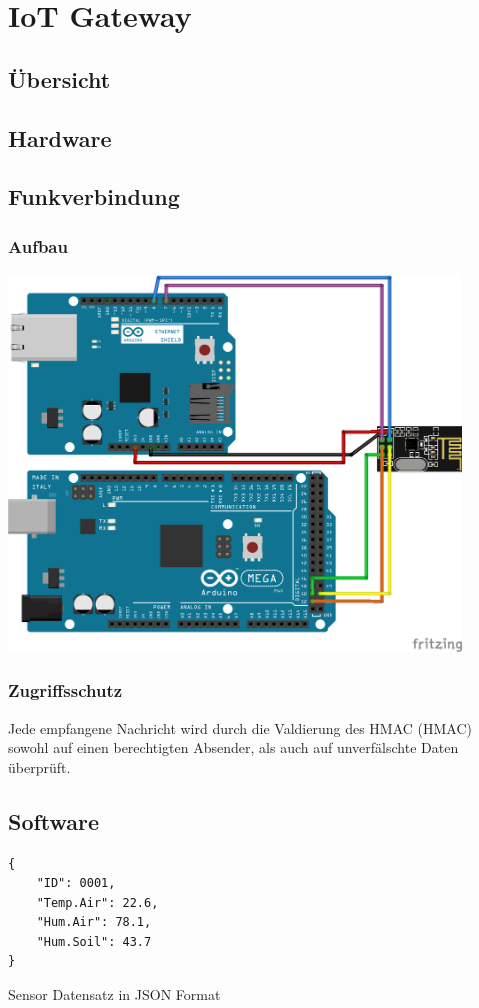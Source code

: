 \documentclass[
  12pt, %
  a4paper, %
  twoside, %
  openany, %
  numbers=noenddot, %
  BCOR=5mm, %
  parskip=half*, %
  thesis, %
]{bfhbook}
\begin{document}
\chapter{IoT Gateway}
\section{Übersicht}
\section{Hardware}
\section{Funkverbindung}
\subsection{Aufbau}
\begin{center}
  \begin{center}
    \includegraphics[width=12cm, left]{Bilder/MQTT-Gateway-Design_Steckplatine.png}
  \end{center}
\end{center}
\subsection{Zugriffsschutz}
Jede empfangene Nachricht wird durch die Valdierung des HMAC (\Gls{HMAC}) sowohl auf einen berechtigten Absender, als auch auf unverfälschte Daten überprüft.
\section{Software}
\begin{listing}
\begin{verbatim}
{     
    "ID": 0001, 
    "Temp.Air": 22.6,
    "Hum.Air": 78.1, 
    "Hum.Soil": 43.7
}
\end{verbatim}
\caption{Sensor Datensatz in JSON Format} 
\label{json-example}
\end{listing}
\end{document}
